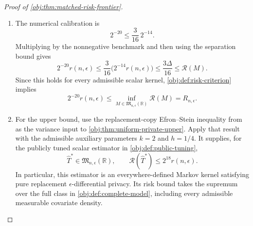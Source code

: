 \documentclass[11pt]{article}
\begin{document}
\begin{proof}[Proof of \cref{obj:thm:matched-risk-frontier}]
\begin{enumerate}
In the first case take \(\eta=0\), and in the second take \(\eta=1\). The absolute loss is at least \(\Delta/2\) on the corresponding error event, so
\[
\int_{\mathbb R}|u-\eta\Delta|\,d\mathsf L_\eta(u)
\ge
\frac{\Delta}{2}\mathsf L_\eta(\mathcal E_\eta)
\ge
\frac{\Delta}{2}\frac38
=
\frac{3\Delta}{16}.
\]

Finite-prior averaging and the common target within each family give
\[
\begin{aligned}
\int_{\mathbb R}|u-\eta\Delta|\,d\mathsf L_\eta(u)
&=
\frac{1}{N_{\mathrm{prior},\eta}}
\sum_{\iota=1}^{N_{\mathrm{prior},\eta}}
E_{(P_{\eta,\iota}^{\mathrm{obs}})^{\otimes n},M}
|M(D)-\theta(P_{\eta,\iota})|\\
&\le
\frac{1}{N_{\mathrm{prior},\eta}}
\sum_{\iota=1}^{N_{\mathrm{prior},\eta}}\mathcal R(M)
=
\mathcal R(M).
\end{aligned}
\]
These identities and inequalities concern nonnegative extended integrals and remain valid when a risk is infinite. In either case,
\[
\frac{3\Delta}{16}\le\mathcal R(M).
\]

\item The numerical calibration is
\[
2^{-20}\le\frac{3}{16}\,2^{-14}.
\]
Multiplying by the nonnegative benchmark and then using the separation bound gives
\[
2^{-20}r(n,\epsilon)
\le
\frac{3}{16}\bigl(2^{-14}r(n,\epsilon)\bigr)
\le
\frac{3\Delta}{16}
\le
\mathcal R(M).
\]
Since this holds for every admissible scalar kernel, \cref{obj:def:risk-criterion} implies
\[
2^{-20}r(n,\epsilon)
\le
\inf_{M\in\mathfrak M_{n,\epsilon}(\mathbb R)}\mathcal R(M)
=
R_{n,\epsilon}.
\]

\item For the upper bound, use the replacement-copy Efron--Stein inequality from \citep[Theorem 3.1, p.~54]{BoucheronLugosiMassart2013} as the variance input to \cref{obj:thm:uniform-private-upper}. Apply that result with the admissible auxiliary parameters \(k=2\) and \(h=1/4\). It supplies, for the publicly tuned scalar estimator in \cref{obj:def:public-tuning},
\[
\widehat T^*\in\mathfrak M_{n,\epsilon}(\mathbb R),
\qquad
\mathcal R(\widehat T^*)\le2^{18}r(n,\epsilon).
\]
In particular, this estimator is an everywhere-defined Markov kernel satisfying pure replacement \(\epsilon\)-differential privacy. Its risk bound takes the supremum over the full class in \cref{obj:def:complete-model}, including every admissible measurable covariate density.


\end{enumerate}
\end{proof}
\end{document}
